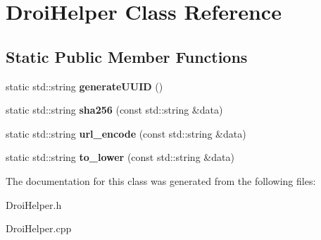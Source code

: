 \hypertarget{class_droi_helper}{}\section{Droi\+Helper Class Reference}
\label{class_droi_helper}
\subsection*{Static Public Member Functions}
\begin{DoxyCompactItemize}
\item 
\mbox{\label{class_droi_helper_a0457afca9a9231dd4d69ed764445339e}} 
static std\+::string {\bfseries generate\+U\+U\+ID} ()
\item 
\mbox{\label{class_droi_helper_ab5485b9d339ee0f6484a639634d324bb}} 
static std\+::string {\bfseries sha256} (const std\+::string \&data)
\item 
\mbox{\label{class_droi_helper_a722b7d20390c3c949f57bcdb3faf2eaf}} 
static std\+::string {\bfseries url\+\_\+encode} (const std\+::string \&data)
\item 
\mbox{\label{class_droi_helper_a64d1a7d41c2808acffc9801414c0ac9c}} 
static std\+::string {\bfseries to\+\_\+lower} (const std\+::string \&data)
\end{DoxyCompactItemize}


The documentation for this class was generated from the following files\+:\begin{DoxyCompactItemize}
\item 
Droi\+Helper.\+h\item 
Droi\+Helper.\+cpp\end{DoxyCompactItemize}
